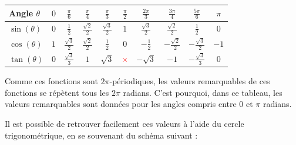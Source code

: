 \documentclass[a4paper]{article}
\begin{document}
			\begin{center}
				\setcellgapes{1.5mm}
				\makegapedcells
				\begin{tabular}{|l||c||c|c|c||c||c|c|c||c|}
					\hline
					Angle $\theta$ & $0$ & {\large $\frac{\pi}{6}$} & {\large $\frac{\pi}{4}$} & {\large $\frac{\pi}{3}$} & {\large $\frac{\pi}{2}$} & {\large $\frac{2\pi}{3}$} & {\large $\frac{3\pi}{4}$} & {\large $\frac{5\pi}{6}$} & $\pi$\\
					\hline
					\hline
					$\sin(\theta)$ & $0$ & {\large $\frac{1}{2}$} & {\large $\frac{\sqrt{2}}{2}$} & {\large $\frac{\sqrt{3}}{2}$} & $1$ & {\large $\frac{\sqrt{3}}{2}$} & {\large $\frac{\sqrt{2}}{2}$} & {\large $\frac{1}{2}$} & $0$ \\
					\hline
					$\cos(\theta)$ & $1$ & {\large $\frac{\sqrt{3}}{2}$} & {\large $\frac{\sqrt{2}}{2}$} & {\large $\frac{1}{2}$} & $0$ & {\large $-\frac{1}{2}$} & {\large $-\frac{\sqrt{2}}{2}$} & {\large $-\frac{\sqrt{3}}{2}$} & $-1$ \\
					\hline
					$\tan(\theta)$ & $0$ & {\large $\frac{\sqrt{3}}{3}$} & $1$ & $\sqrt{3}$ & \textcolor{Red}{\LARGE {$\times$}} & $-\sqrt{3}$ & $-1$ & {\large $-\frac{\sqrt{3}}{3}$ } & $0$ \\
					\hline
				\end{tabular}
			\end{center}

			Comme ces fonctions sont $2\pi$-périodiques,
			les valeurs remarquables de ces fonctions se répètent tous les $2\pi$ radians.
			C'est pourquoi, dans ce tableau, 
			les valeurs remarquables sont données pour les angles compris entre $0$ et $\pi$ radians.

			\vfill

			Il est possible de retrouver facilement ces valeurs 
			à l'aide du cercle trigonométrique, en se souvenant du
			schéma suivant :
			
\end{document}
